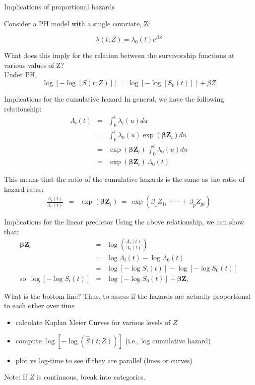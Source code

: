 \documentclass[envcountsect, 10pt, portrait, palatino]{beamer}
\begin{document}
\begin{frame}{ Implications of proportional hazards}

Consider a PH model with a single covariate, Z:

\[   \lambda(t; Z)  = \lambda_0(t) e^{\beta Z} \]


What does this imply for the relation between the survivorship
functions at various values of Z?
\\[2ex]
Under PH,
\[  \log[-\log[S(t;Z)]] =  \log[-\log[S_0(t)]] + \beta Z \]
\end{frame}
\begin{frame}{Implications for the cumulative hazard}
In general, we have the following relationship:
\begin{eqnarray*}
\Lambda_i(t) & = & \int_0^t \lambda_i(u) du\\[1ex]
             & = & \int_0^t \lambda_0(u) \exp(\mathbf{\beta}\mathbf{Z}_i) du\\[1ex]
             & = & \exp(\mathbf{\beta}\mathbf{Z}_i) \, \int_0^t \lambda_0(u) du\\[1ex]
             & = & \exp(\mathbf{\beta}\mathbf{Z}_i) \, \Lambda_0(t)
\end{eqnarray*}

This means that the ratio of the cumulative hazards is the same
as the ratio of hazard rates:
\begin{eqnarray*}
\frac{\Lambda_i(t)}{\Lambda_0(t)} & = & \exp(\mathbf{\beta}\mathbf{Z}_i)
~=~ \exp(\beta_1 Z_{1i} + \cdots + \beta_p Z_{pi})
\end{eqnarray*}
\end{frame}
\begin{frame}{Implications for the linear predictor}
Using the above relationship, we can show that:
\begin{eqnarray*}
\mathbf{\beta}\mathbf{Z}_i & = & \log \left(\frac{\Lambda_i(t)}{\Lambda_0(t)}\right)\\[2ex]
& = & \log \Lambda_i(t) - \log \Lambda_0(t)  \\[2ex]
& = & \log[-\log S_i(t)] - \log[-\log S_0(t)]  \\[2ex]
\mbox{so}~~ \log[-\log S_i(t)] & = & \log[-\log S_0(t)] + \mathbf{\beta}\mathbf{Z}_i
\end{eqnarray*}
\end{frame}
\begin{frame}{What is the bottom line?}
Thus, to assess if the hazards are actually proportional to each other
over time
\begin{itemize}
\item  calculate Kaplan Meier Curves for various levels of $Z$
\item  compute $\log[-\log(\hat{S}(t;Z))]$ (i.e., log cumulative hazard)
\item  plot vs log-time to see if they are parallel (lines or curves)
\end{itemize}
Note:  If $Z$ is continuous, break into categories.
\end{frame}
\end{document}
